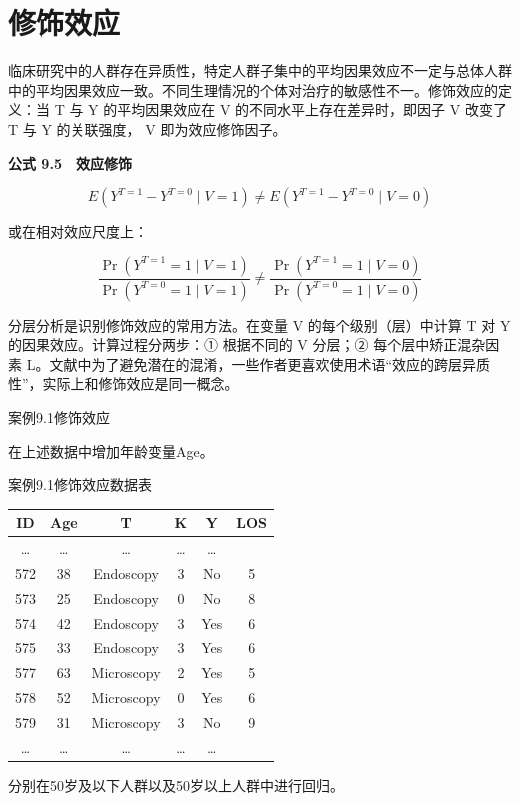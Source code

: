 \documentclass[
  chinese-hans,
  letterpaper,
  DIV=11,
  numbers=noendperiod]{scrreprt}
\newcounter{none} %
\begin{document}
\section{修饰效应}\label{ux4feeux9970ux6548ux5e94}

临床研究中的人群存在异质性，特定人群子集中的平均因果效应不一定与总体人群中的平均因果效应一致。不同生理情况的个体对治疗的敏感性不一。修饰效应的定义：当
T 与 Y 的平均因果效应在 V 的不同水平上存在差异时，即因子 V 改变了 T 与 Y
的关联强度， V 即为效应修饰因子。

\textbf{公式 9.5　效应修饰}

\[E\!\left(Y^{T=1}-Y^{T=0}\mid V=1\right) \ne E\!\left(Y^{T=1}-Y^{T=0}\mid V=0\right)\]

或在相对效应尺度上：

\[\frac{\Pr(Y^{T=1}=1\mid V=1)}{\Pr(Y^{T=0}=1\mid V=1)} \ne \frac{\Pr(Y^{T=1}=1\mid V=0)}{\Pr(Y^{T=0}=1\mid V=0)}\]

分层分析是识别修饰效应的常用方法。在变量 V 的每个级别（层）中计算 T 对 Y
的因果效应。计算过程分两步：① 根据不同的 V 分层；② 每个层中矫正混杂因素
L。文献中为了避免潜在的混淆，一些作者更喜欢使用术语``效应的跨层异质性''，实际上和修饰效应是同一概念。

案例9.1修饰效应

在上述数据中增加年龄变量Age。

案例9.1修饰效应数据表

{\def\LTcaptype{none} %
\begin{longtable}[]{@{}cccccc@{}}
\toprule\noalign{}
ID & Age & T & K & Y & LOS \\
\midrule\noalign{}
\endhead
\bottomrule\noalign{}
\endlastfoot
\ldots{} & \ldots{} & \ldots{} & \ldots{} & \ldots{} & \\
572 & 38 & Endoscopy & 3 & No & 5 \\
573 & 25 & Endoscopy & 0 & No & 8 \\
574 & 42 & Endoscopy & 3 & Yes & 6 \\
575 & 33 & Endoscopy & 3 & Yes & 6 \\
577 & 63 & Microscopy & 2 & Yes & 5 \\
578 & 52 & Microscopy & 0 & Yes & 6 \\
579 & 31 & Microscopy & 3 & No & 9 \\
\ldots{} & \ldots{} & \ldots{} & \ldots{} & \ldots{} & \\
\end{longtable}
}

分别在50岁及以下人群以及50岁以上人群中进行回归。
\end{document}
